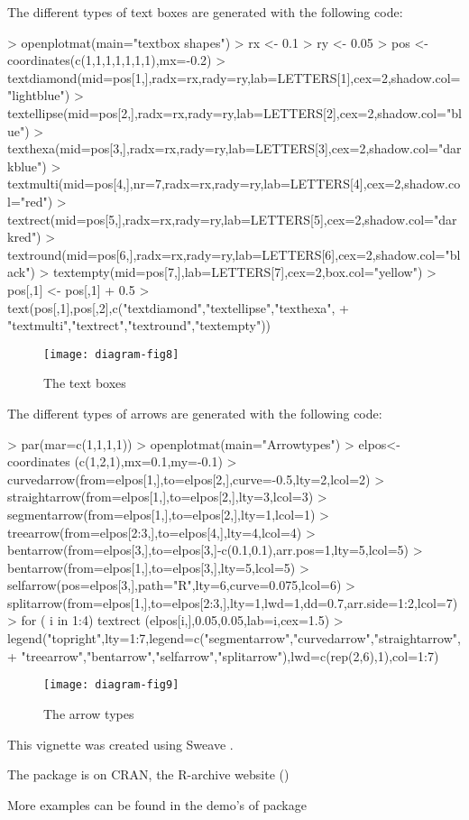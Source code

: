 \documentclass[article,nojss]{jss}
\begin{document}
The different types of text boxes are generated with the following code:
\begin{Schunk}
\begin{Sinput}
> openplotmat(main="textbox shapes")
> rx <- 0.1
> ry <- 0.05
> pos <- coordinates(c(1,1,1,1,1,1,1),mx=-0.2)
> textdiamond(mid=pos[1,],radx=rx,rady=ry,lab=LETTERS[1],cex=2,shadow.col="lightblue")
> textellipse(mid=pos[2,],radx=rx,rady=ry,lab=LETTERS[2],cex=2,shadow.col="blue")
> texthexa(mid=pos[3,],radx=rx,rady=ry,lab=LETTERS[3],cex=2,shadow.col="darkblue")
> textmulti(mid=pos[4,],nr=7,radx=rx,rady=ry,lab=LETTERS[4],cex=2,shadow.col="red")
> textrect(mid=pos[5,],radx=rx,rady=ry,lab=LETTERS[5],cex=2,shadow.col="darkred")
> textround(mid=pos[6,],radx=rx,rady=ry,lab=LETTERS[6],cex=2,shadow.col="black")
> textempty(mid=pos[7,],lab=LETTERS[7],cex=2,box.col="yellow")
> pos[,1] <- pos[,1] + 0.5
> text(pos[,1],pos[,2],c("textdiamond","textellipse","texthexa",
+                        "textmulti","textrect","textround","textempty"))
\end{Sinput}
\end{Schunk}
\begin{figure}
\begin{center}
\texttt{[image: diagram-fig8]}
\end{center}
\caption{The text boxes}
\label{fig:eight}
\end{figure}

The different types of arrows are generated with the following code:
\begin{Schunk}
\begin{Sinput}
> par(mar=c(1,1,1,1))
> openplotmat(main="Arrowtypes")
> elpos<-coordinates (c(1,2,1),mx=0.1,my=-0.1)
> curvedarrow(from=elpos[1,],to=elpos[2,],curve=-0.5,lty=2,lcol=2)
> straightarrow(from=elpos[1,],to=elpos[2,],lty=3,lcol=3)
> segmentarrow(from=elpos[1,],to=elpos[2,],lty=1,lcol=1)
> treearrow(from=elpos[2:3,],to=elpos[4,],lty=4,lcol=4)
> bentarrow(from=elpos[3,],to=elpos[3,]-c(0.1,0.1),arr.pos=1,lty=5,lcol=5)
> bentarrow(from=elpos[1,],to=elpos[3,],lty=5,lcol=5)
> selfarrow(pos=elpos[3,],path="R",lty=6,curve=0.075,lcol=6)
> splitarrow(from=elpos[1,],to=elpos[2:3,],lty=1,lwd=1,dd=0.7,arr.side=1:2,lcol=7)
> for ( i in 1:4) textrect (elpos[i,],0.05,0.05,lab=i,cex=1.5)
> legend("topright",lty=1:7,legend=c("segmentarrow","curvedarrow","straightarrow",
+ "treearrow","bentarrow","selfarrow","splitarrow"),lwd=c(rep(2,6),1),col=1:7)
\end{Sinput}
\end{Schunk}
\begin{figure}
\begin{center}
\texttt{[image: diagram-fig9]}
\end{center}
\caption{The arrow types}
\label{fig:nine}
\end{figure}

This vignette was created using Sweave \citep{Leisch02}.

The package is on CRAN, the R-archive website (\citep{R2008})

More examples can be found in the demo's of package  \citep{Soetaert08e}


\end{document}
